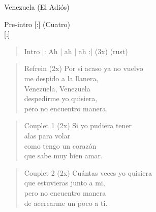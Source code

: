 \begin{song}{Venezuela (El Adiós)}
\begin{instrumental}{Pre-intro}
  [:] (Cuatro) \\
  \measure{}  \measure{}    [:]
\end{instrumental}

\begin{verse}{Intro}
|:  \hspace{1em}Ah \hspace{2em} | ah \hspace{2em} | ah \hspace{2em} :| (3x) \hspace{1em}  \hspace{1em}(rust)
\end{verse}

\begin{verse}{Refrein (2x)}
\chord{}Por si acaso ya no vuelvo\\
\chord{}me despido a la llanera,\\
Venezuela, Venezuela\\
despedirme yo quisiera,\\
pero no encuentro manera. \hspace{1em} \\
\end{verse}

\begin{verse}{Couplet 1 (2x)}
Si yo pudiera tener\\
alas para volar\\
como tengo un corazón\\
que sabe muy bien amar.\\
\end{verse}
\begin{verse}{Couplet 2 (2x)}
Cu\'{a}ntas veces yo quisiera\\
que estuvieras junto a mi,\\
pero no encuentro manera\\
de acercarme un poco a ti.\hspace{2em}
\end{verse}


\end{song}
